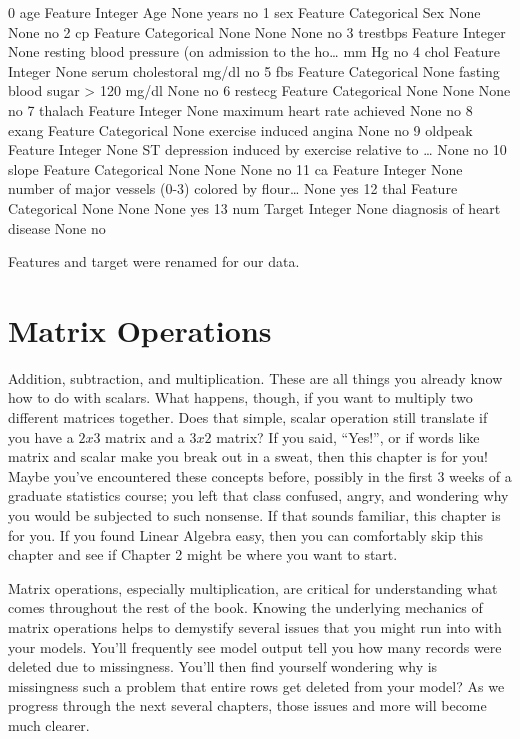 \documentclass[
  letterpaper,
]{krantz}
\begin{document}
0 age Feature Integer Age None years no 1 sex Feature Categorical Sex
None None no 2 cp Feature Categorical None None None no 3 trestbps
Feature Integer None resting blood pressure (on admission to the
ho\ldots{} mm Hg no 4 chol Feature Integer None serum cholestoral mg/dl
no 5 fbs Feature Categorical None fasting blood sugar \textgreater{} 120
mg/dl None no 6 restecg Feature Categorical None None None no 7 thalach
Feature Integer None maximum heart rate achieved None no 8 exang Feature
Categorical None exercise induced angina None no 9 oldpeak Feature
Integer None ST depression induced by exercise relative to \ldots{} None
no 10 slope Feature Categorical None None None no 11 ca Feature Integer
None number of major vessels (0-3) colored by flour\ldots{} None yes 12
thal Feature Categorical None None None yes 13 num Target Integer None
diagnosis of heart disease None no

Features and target were renamed for our data.

\chapter{Matrix Operations}\label{matrix-operations}

Addition, subtraction, and multiplication. These are all things you
already know how to do with scalars. What happens, though, if you want
to multiply two different matrices together. Does that simple, scalar
operation still translate if you have a \(2x3\) matrix and a \(3x2\)
matrix? If you said, ``Yes!'', or if words like matrix and scalar make
you break out in a sweat, then this chapter is for you! Maybe you've
encountered these concepts before, possibly in the first 3 weeks of a
graduate statistics course; you left that class confused, angry, and
wondering why you would be subjected to such nonsense. If that sounds
familiar, this chapter is for you. If you found Linear Algebra easy,
then you can comfortably skip this chapter and see if Chapter 2 might be
where you want to start.

Matrix operations, especially multiplication, are critical for
understanding what comes throughout the rest of the book. Knowing the
underlying mechanics of matrix operations helps to demystify several
issues that you might run into with your models. You'll frequently see
model output tell you how many records were deleted due to missingness.
You'll then find yourself wondering why is missingness such a problem
that entire rows get deleted from your model? As we progress through the
next several chapters, those issues and more will become much clearer.
\end{document}
